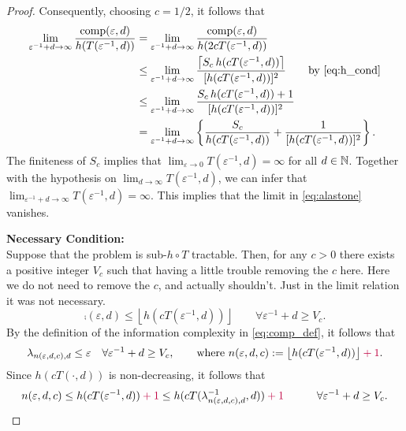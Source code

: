 \documentclass[11pt,a4paper]{article}
\newcommand{\fred}[1]{\begingroup\color{blue}#1\endgroup}
\newcommand{\peter}[1]{\begingroup\color{purple}#1\endgroup}
\begin{document}
\begin{proof}
{}

 
Consequently, choosing $c=1/2$, it follows that 
\begin{align}
\nonumber
\lim_{\varepsilon^{-1} + d \to \infty} \frac{\operatorname{comp}(\varepsilon,d)}{ h(T(\varepsilon^{-1},d))  }
& = \lim_{\varepsilon^{-1} + d \to \infty} \frac{\operatorname{comp}(\varepsilon,d)}{ h(2cT(\varepsilon^{-1},d))  } \\
& \le \lim_{\varepsilon^{-1} + d \to \infty} \frac{ \left\lceil 
	S_c \, h(cT(\varepsilon^{-1},d)) \right\rceil}{ [h(cT(\varepsilon^{-1},d))]^2  } \qquad \text{by \eqref{eq:h_cond}}
\\
\nonumber
& \le \lim_{\varepsilon^{-1} + d \to \infty} \frac{
	S_c \, h(cT(\varepsilon^{-1},d))+1}{ [h(cT(\varepsilon^{-1},d))]^2  }  \\
& = \lim_{\varepsilon^{-1} + d \to \infty} \left \{\frac{
	S_c }{ h(cT(\varepsilon^{-1},d))  }  + \frac{
	1}{ [h(cT(\varepsilon^{-1},d))]^2 } \right \} \label{eq:alastone}.
\end{align}	
The finiteness of $S_c$ implies that $\lim_{\varepsilon \to 0} T(\varepsilon^{-1},d) = \infty$ for all $d \in \mathbb{N}$.  Together with the hypothesis on $\lim_{d \to \infty} T(\varepsilon^{-1},d)$, we can infer that $\lim_{\varepsilon^{-1} + d \to \infty} T(\varepsilon^{-1},d) = \infty$.  This implies that the limit in \eqref{eq:alastone} vanishes.

\bigskip
	  
\noindent \textbf{Necessary Condition:}\\
Suppose that the problem is  sub-$h \circ T$ tractable. Then, for any $c>0$ there exists a positive integer $V_c$ such that  \fred{having a little trouble removing the $c$ here.} \peter{Here we do not need to remove the $c$, and actually shouldn't. Just in the limit relation it was not necessary.}
\[
	\comp(\varepsilon,d)\le 
	\left\lfloor h(cT(\varepsilon^{-1},d)) \right\rfloor \qquad \forall \varepsilon^{-1} + d \ge V_c.
\]
By the definition of the information complexity in \eqref{eq:comp_def}, it follows that 
\[
	\lambda_{n(\varepsilon,d,c),d} \le \varepsilon \quad \forall \varepsilon^{-1} + d \ge V_c, \qquad \text{where }
	n(\varepsilon,d,c):=\left\lfloor h(cT(\varepsilon^{-1},d)) \right\rfloor \peter{+1}.
\]
Since $h(cT(\cdot,d))$ is non-decreasing, it follows that
\begin{equation}
		n(\varepsilon,d,c)\le  h(cT(\varepsilon^{-1},d)) \peter{+1}\le  h(cT(\lambda^{-1}_{n(\varepsilon,d,c),d},d)) \peter{+1}\qquad  \quad \forall \varepsilon^{-1} + d \ge V_c. \label{eq:nedcbound}
\end{equation}
	

\end{proof}
\end{document}
